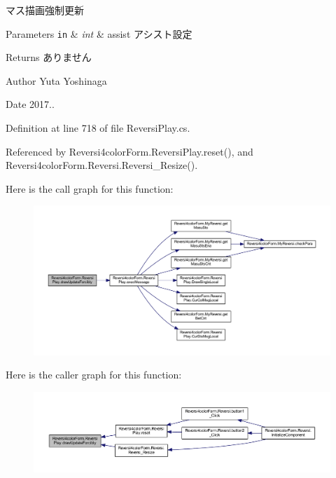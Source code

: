 マス描画強制更新 


\begin{DoxyParams}[1]{Parameters}
\mbox{\tt in}  & {\em int} & assist アシスト設定 \\
\hline
\end{DoxyParams}
\begin{DoxyReturn}{Returns}
ありません 
\end{DoxyReturn}
\begin{DoxyAuthor}{Author}
Yuta Yoshinaga 
\end{DoxyAuthor}
\begin{DoxyDate}{Date}
2017.. 
\end{DoxyDate}


Definition at line 718 of file Reversi\+Play.\+cs.



Referenced by Reversi4color\+Form.\+Reversi\+Play.\+reset(), and Reversi4color\+Form.\+Reversi.\+Reversi\+\_\+\+Resize().

Here is the call graph for this function\+:\nopagebreak
\begin{figure}[H]
\begin{center}
\leavevmode
\includegraphics[width=350pt]{class_reversi4color_form_1_1_reversi_play_a0ef55faf321fa98d44baad4f25ae6940_cgraph}
\end{center}
\end{figure}
Here is the caller graph for this function\+:\nopagebreak
\begin{figure}[H]
\begin{center}
\leavevmode
\includegraphics[width=350pt]{class_reversi4color_form_1_1_reversi_play_a0ef55faf321fa98d44baad4f25ae6940_icgraph}
\end{center}
\end{figure}
\mbox{\label{class_reversi4color_form_1_1_reversi_play_a3e9c0923815d7270ae73c88ff57244d4}} 
